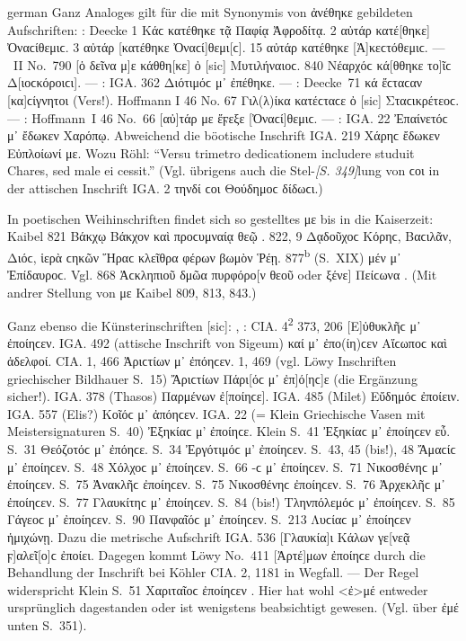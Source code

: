 \begin{otherlanguage*}{german}
Ganz Analoges gilt für die mit Synonymis von ἀνέθηκε gebildeten Aufschriften:  : Deecke 1 Κάϲ  κατέθηκε τᾷ Παφίᾳ Ἀφροδίτᾳ. 2 αὐτάρ  κατέ[θηκε] Ὀναϲίθεμιϲ. 3 αὐτάρ  [κατέθηκε Ὀναϲί]θεμι[ϲ]. 15 αὐτάρ  κατέθηκε [Ἀ]κεϲτόθεμιϲ. — ~II No.~790 [ὁ δεῖνα μ]ε κάθθη[κε] ὀ [sic] Μυτιλήναιοϲ. 840 Νέαρχόϲ  κά[θθηκε το]ῖϲ Δ[ιοϲκόροιϲι]. —  : IGA. 362 Διότιμόϲ μ᾽ ἐπέθηκε. —  : \mbox{Deecke}~71 κά  ἔϲταϲαν [κα]ϲίγνη\-τοι (Vers!). Hoffmann I 46 No. 67 Γιλ(λ)ίκα  κατέϲταϲε ὀ [sic] Σταϲικρέτεοϲ. —  : Hoffmann~I 46 No.~66 [αὐ]τάρ με ἔϝεξε [Ὀναϲί]θεμιϲ. —  : IGA. 22 Ἐπαίνετόϲ μ᾽ ἔδωκεν Χαρόπῳ. Abweichend die böotische Inschrift IGA. 219 Χάρηϲ ἔδωκεν Εὐπλοίωνί με. Wozu Röhl: “Versu trimetro dedicationem includere studuit Chares, sed male ei cessit.” (Vgl. übrigens auch die Stel-\hypertarget{p349}{\emph{[S. 349]}}\label{p349}lung von ϲοι in der attischen Inschrift IGA. 2 τηνδί ϲοι Θούδημοϲ δίδωϲι.)

In poetischen Weihinschriften findet sich so gestelltes με bis in die Kaiserzeit: Kaibel 821 Βάκχῳ  Βάκχον καὶ προϲυμναίᾳ θεῷ . 822, 9 Δᾳδοῦχοϲ  Κόρηϲ, Βαϲιλᾶν, Διόϲ, ἱερὰ ϲηκῶν Ἥραϲ κλεῖθρα φέρων βωμὸν  Ῥέῃ. 877\textsuperscript{b} (S.~XIX)  μέν μ᾽ Ἐπίδαυροϲ. Vgl. 868 Ἀϲκληπιοῦ  δμῶα πυρφόρο[ν θεοῦ oder ξένε] Πείϲωνα . (Mit andrer Stellung von με Kaibel 809, 813, 843.)

Ganz ebenso die Künsterinschriften [sic]: , : CIA. 4\textsuperscript{2} 373, 206 [Ε]ὐθυκλῆϲ μ᾽ ἐποίηϲεν. IGA. 492 (attische Inschrift von Sigeum) καί μ᾽ ἐπο(ίη)ϲεν Αἵϲωποϲ καὶ ἁδελφοί. CIA. 1, 466 Ἀριϲτίων μ᾽ ἐπόηϲεν. 1, 469 (vgl. Löwy Inschriften griechischer Bildhauer S.~15) Ἄριϲτίων Πάρι[όϲ μ᾽ ἐπ]ό[ηϲ]ε (die Ergänzung sicher!). IGA. 378 (Thasos) Παρμένων  ἐ[ποίηϲε]. IGA. 485 (Milet) Εὔδημόϲ  ἐποίειν. IGA. 557 (Elis?) Κοῖόϲ μ᾽ ἀπόηϲεν. IGA. 22 (= Klein Griechische Vasen mit Meistersignaturen S.~40) Ἐξηκίαϲ μ’ ἐποίηϲε. Klein S.~41 Ἐξηκίαϲ μ᾽ ἐποίηϲεν εὖ. S.~31 Θεόζοτόϲ μ᾽ ἐπόηϲε. S.~34 Ἐργότιμόϲ μ’ ἐποίηϲεν. S.~43, 45 (bis!), 48 Ἄμαϲίϲ μ᾽ ἐποίηϲεν. S.~48 Χόλχοϲ μ᾽ ἐποίηϲεν. S.~66 -ϲ μ᾽ ἐποίηϲεν. S.~71 Νικοσθένηϲ μ᾽ ἐποίηϲεν. S.~75 Ἀνακλῆϲ  ἐποίηϲεν. S.~75 Νικοσθένηϲ  ἐποίηϲεν. S.~76 Ἀρχεκλῆϲ μ᾽ ἐποίηϲεν. S.~77 Γλαυκίτηϲ μ᾽ ἐποίηϲεν. S.~84 (bis!) Τληνπόλεμόϲ μ᾽ ἐποίηϲεν. S.~85 Γάγεοϲ μ᾽ ἐποίηϲεν. S.~90 Πανφαῖόϲ μ᾽ ἐποίηϲεν. S.~213 Λυϲίαϲ μ᾽ ἐποίηϲεν ἡμιχώνῃ. Dazu die metrische Aufschrift IGA. 536 [Γλαυκία]ι  Κάλων γε[νεᾷ ϝ]αλεῖ[ο]ϲ ἐποίει. Dagegen kommt Löwy No.~411 [Ἀρτέ]μων  ἐποίηϲε durch die Behandlung der Inschrift bei Köhler CIA. 2, 1181 in Wegfall. — Der Regel widerspricht Klein S.~51 Χαριταῖοϲ ἐποίηϲεν . Hier hat wohl <ἐ>μέ entweder ursprünglich dagestanden oder ist wenigstens beabsichtigt gewesen. (Vgl. über ἐμέ unten S.~351).


\end{otherlanguage*}
